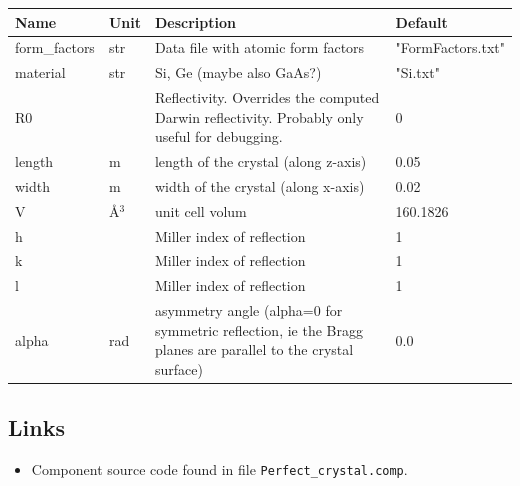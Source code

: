 \begin{longtable}{p{}p{}p{}p{}}
\toprule
\textbf{Name} & \textbf{Unit} & \textbf{Description} & \textbf{Default} \\
\midrule
\endhead
form\_factors & str & Data file with atomic form factors & "FormFactors.txt" \\
material & str & Si, Ge (maybe also GaAs?) & "Si.txt" \\
R0 &   & Reflectivity. Overrides the computed Darwin reflectivity. Probably only useful for debugging. & 0 \\
length & m & length of the crystal (along z-axis) & 0.05 \\
width & m & width of the crystal (along x-axis) & 0.02 \\
V & \AA{}$^{3}$ & unit cell volum & 160.1826 \\
h &   & Miller index of reflection & 1 \\
k &   & Miller index of reflection & 1 \\
l &   & Miller index of reflection & 1 \\
alpha & rad & asymmetry angle (alpha=0 for symmetric reflection, ie the Bragg planes are parallel to the crystal surface) & 0.0 \\
\bottomrule
\end{longtable}

\subsection*{Links}
\begin{itemize}
  \item Component source code found in file \texttt{Perfect\_crystal.comp}.
\end{itemize}
